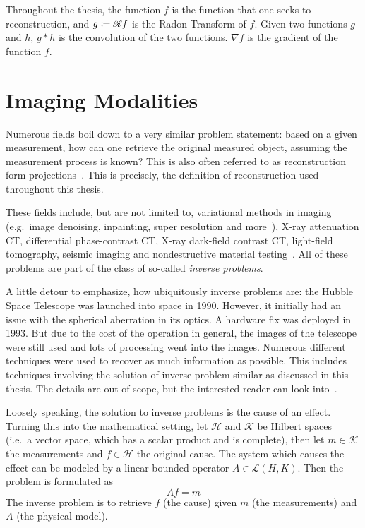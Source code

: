 Throughout the thesis, the function \(f\) is the function that one seeks to reconstruction, and
\(g \coloneq \mathscr{R} f\) is the Radon Transform of \(f\). Given two functions \(g\) and \(h\),
\(g \ast h\) is the convolution of the two functions. \(\nabla f\) is the gradient of the
function \(f\).

\chapter{Imaging Modalities}\label{chap:imaging_modalities}

Numerous fields boil down to a very similar problem statement: based on a given measurement, how can
one retrieve the original measured object, assuming the measurement process is known? This is also
often referred to as reconstruction form projections~\cite{herman_basis_2015}. This is precisely,
the definition of reconstruction used throughout this thesis.

These fields include, but are not limited to, variational methods in imaging (e.g.\ image denoising,
inpainting, super resolution and more~\cite{scherzer_variational_2009}), X-ray attenuation CT,
differential phase-contrast CT, X-ray dark-field contrast CT, light-field tomography, seismic
imaging and nondestructive material testing~\cite{carpio_inverse_2008}. All of these problems are
part of the class of so-called \textit{inverse problems}.

A little detour to emphasize, how ubiquitously inverse problems are: the Hubble Space Telescope was
launched into space in 1990. However, it initially had an issue with the spherical aberration in its
optics. A hardware fix was deployed in 1993. But due to the cost of the operation in general, the
images of the telescope were still used and lots of processing went into the images. Numerous
different techniques were used to recover as much information as possible. This includes techniques
involving the solution of inverse problem similar as discussed in this thesis. The details are out
of scope, but the interested reader can look into~\cite{white_restoration_1992,adorf_hubble_1995}.

\begin{definition}\label{def:inverse_problem}
	Loosely speaking, the solution to inverse problems is the cause of an effect. Turning this
	into the mathematical setting, let \(\mathcal{H}\) and \(\mathcal{K}\) be Hilbert spaces
	(i.e.\ a vector space, which has a scalar product and is complete), then let \(m \in
	\mathcal{K}\) the measurements and \(f \in \mathcal{H}\) the original cause. The system
	which causes the effect can be modeled by a linear bounded operator \(A \in \mathscr{L}(H,
	K)\). Then the problem is formulated as
	\[ A f = m \]
	The inverse problem is to retrieve \(f\) (the cause) given \(m\) (the measurements) and \(A\)
	(the physical model).
\end{definition}

